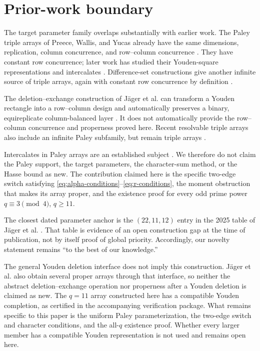 \documentclass[11pt]{article}
\theoremstyle{definition}
\theoremstyle{remark}
\begin{document}
\section{Prior-work boundary}
The target parameter family overlaps substantially with earlier work.  The
Paley triple arrays of Preece, Wallis, and Yucas already have the same
dimensions, replication, column concurrence, and row--column concurrence
\cite{preece-paley}.  They have constant row concurrence; later work has
studied their Youden-square representations and intercalates
\cite{nilson-youden,nilson-intercalates}.  Difference-set constructions give
another infinite source of triple arrays, again with constant row concurrence
by definition \cite{nilson-cameron}.

The deletion--exchange construction of J\"ager et al. can transform a Youden
rectangle into a row--column design and automatically preserves a binary,
equireplicate column-balanced layer \cite[Construction~5.2 and
Theorem~5.3]{jager-youden}.  It does not automatically provide the
row--column concurrence and properness proved here.  Recent resolvable triple
arrays also include an infinite Paley subfamily, but remain triple arrays
\cite{gordeev-ohman}.

Intercalates in Paley arrays are an established subject
\cite{nilson-intercalates}.  We therefore do not claim the Paley support, the
target parameters, the character-sum method, or the Hasse bound as new.  The
contribution claimed here is the
specific two-edge switch satisfying
\eqref{eq:alpha-conditions}--\eqref{eq:r-conditions}, the moment obstruction
that makes its array proper, and the existence proof for every odd prime
power \(q\equiv3\pmod4\), \(q\geq11\).

The closest dated parameter anchor is the \((22,11,12)\) entry in the 2025
table of J\"ager et al. \cite[Table~2]{jager-enumeration}.  That table is
evidence of an open construction gap at the time of publication, not by
itself proof of global priority.  Accordingly, our novelty statement remains
``to the best of our knowledge.''

The general Youden deletion interface does not imply this construction.
J\"ager et al. also obtain several proper arrays through that interface, so
neither the abstract deletion--exchange operation nor properness after a
Youden deletion is claimed as new.  The \(q=11\) array constructed here has a
compatible Youden completion, as certified in the accompanying verification
package.  What remains specific to this paper is the uniform Paley
parameterization, the two-edge switch and character conditions, and the
all-\(q\) existence proof.  Whether every larger member has a compatible
Youden representation is not used and remains open here.
\end{document}
